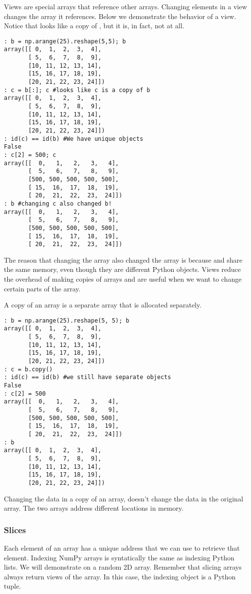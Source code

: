Views are special arrays that reference other arrays.  Changing elements in a view changes the array it references.  Below we demonstrate the behavior of a view.  Notice that  looks like a copy of , but it is, in fact, not at all.
\begin{lstlisting}
: b = np.arange(25).reshape(5,5); b
array([[ 0,  1,  2,  3,  4],
       [ 5,  6,  7,  8,  9],
       [10, 11, 12, 13, 14],
       [15, 16, 17, 18, 19],
       [20, 21, 22, 23, 24]])
: c = b[:]; c #looks like c is a copy of b
array([[ 0,  1,  2,  3,  4],
       [ 5,  6,  7,  8,  9],
       [10, 11, 12, 13, 14],
       [15, 16, 17, 18, 19],
       [20, 21, 22, 23, 24]])
: id(c) == id(b) #We have unique objects
False
: c[2] = 500; c
array([[  0,   1,   2,   3,   4],
       [  5,   6,   7,   8,   9],
       [500, 500, 500, 500, 500],
       [ 15,  16,  17,  18,  19],
       [ 20,  21,  22,  23,  24]])
: b #changing c also changed b!
array([[  0,   1,   2,   3,   4],
       [  5,   6,   7,   8,   9],
       [500, 500, 500, 500, 500],
       [ 15,  16,  17,  18,  19],
       [ 20,  21,  22,  23,  24]])
\end{lstlisting}

The reason that changing the array  also changed the array  is because  and  share the same memory, even though they are different Python objects.  Views reduce the overhead of making copies of arrays and are useful when we want to change certain parts of the array.

A copy of an array is a separate array that is allocated separately.
\begin{lstlisting}
: b = np.arange(25).reshape(5, 5); b
array([[ 0,  1,  2,  3,  4],
       [ 5,  6,  7,  8,  9],
       [10, 11, 12, 13, 14],
       [15, 16, 17, 18, 19],
       [20, 21, 22, 23, 24]])
: c = b.copy()
: id(c) == id(b) #we still have separate objects
False
: c[2] = 500
array([[  0,   1,   2,   3,   4],
       [  5,   6,   7,   8,   9],
       [500, 500, 500, 500, 500],
       [ 15,  16,  17,  18,  19],
       [ 20,  21,  22,  23,  24]])
: b
array([[ 0,  1,  2,  3,  4],
       [ 5,  6,  7,  8,  9],
       [10, 11, 12, 13, 14],
       [15, 16, 17, 18, 19],
       [20, 21, 22, 23, 24]])
\end{lstlisting}
Changing the data in a copy of an array, doesn't change the data in the original array.  The two arrays address different locations in memory.

\subsubsection*{Slices}
Each element of an array has a unique address that we can use to retrieve that element.  Indexing NumPy arrays is syntatically the same as indexing Python lists.  We will demonstrate on a random 2D array.  Remember that slicing arrays always return views of the array.  In this case, the indexing object is a Python tuple.

